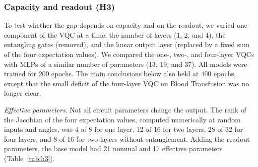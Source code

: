 \subsubsection{Capacity and readout (H3)}

To test whether the gap depends on capacity and on the readout, we varied one component of the VQC at a time: the number of layers (1, 2, and 4), the entangling gates (removed), and the linear output layer (replaced by a fixed sum of the four expectation values). We compared the one-, two-, and four-layer VQCs with MLPs of a similar number of parameters (13, 19, and 37). All models were trained for 200 epochs. The main conclusions below also held at 400 epochs, except that the small deficit of the four-layer VQC on Blood Transfusion was no longer clear. %

\textit{Effective parameters.} Not all circuit parameters change the output. The rank of the Jacobian of the four expectation values, computed numerically at random inputs and angles, was 4 of 8 for one layer, 12 of 16 for two layers, 28 of 32 for four layers, and 8 of 16 for two layers without entanglement. Adding the readout parameters, the base model had 21 nominal and 17 effective parameters (Table~\ref{tab:h3}).

